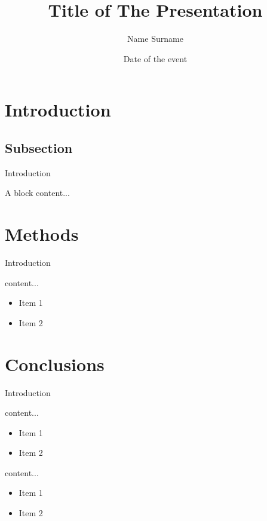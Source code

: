 \documentclass[10pt, aspectratio=169, handout]{uniudpres}
\author{Name Surname}
\title{Title of The Presentation}
\date{Date of the event}
\begin{document}
	
	\maketitle

	\section{Introduction}
	\subsection{Subsection}
	\begin{frame}{Introduction}
		\onslide<2->\begin{block}{A block}
			content...
		\end{block}
	\end{frame}
	
	\section{Methods}
	\begin{frame}{Introduction}
		\begin{block}{content...}
			\begin{itemize}
				\item Item 1
				\item Item 2
			\end{itemize}
		\end{block}
	\end{frame}
	
	\section{Conclusions}
	\begin{frame}{Introduction}
		\begin{block}{content...}
			\begin{itemize}
				\item Item 1
				\item Item 2
			\end{itemize}
		\end{block}
		
		\begin{block}{content...}
			\begin{itemize}
				\item Item 1
				\item Item 2
			\end{itemize}
		\end{block}
	\end{frame}
\end{document}
